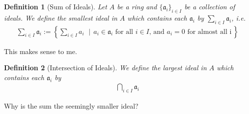 \documentclass{book}
\theoremstyle{custom_definition}
\newtheorem{definition}{Definition}
\begin{document}
    \begin{definition}[Sum of Ideals]
        Let \(A\) be a ring and \(\{\mathfrak{a}_i\}_{i \in I}\) be a collection of ideals. We define the smallest ideal in \(A\) which contains each \(\mathfrak{a}_i\) by \(\sum_{i \in I} \mathfrak{a}_i\), i.e.
        \begin{align}
            \sum_{i \in I} \mathfrak{a}_i := \left\{ \sum_{i \in I} a_i \, \,\mid\, a_i \in \mathfrak{a}_i \text{ for all \(i \in I\), and \(a_i = 0\) for almost all i}\,\right\}
        \end{align}
    \end{definition}

    This makes sense to me.

    \begin{definition}[Intersection of Ideals]
        We define the largest ideal in \(A\) which contains each \(\mathfrak{a}_i\) by
        \begin{align}
            \bigcap_{i \in I} \mathfrak{a}_i
        \end{align}       
    \end{definition}

    Why is the sum the seemingly smaller ideal?
\end{document}
